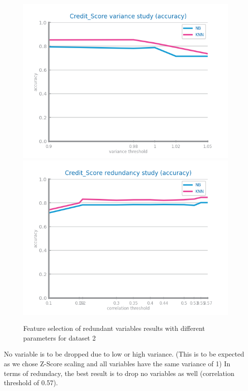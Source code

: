 \documentclass[10pt]{extarticle}
\begin{document}
\begin{figure}[H]
\centering\includegraphics[scale=0.60]{images/dataset2/data_preparation/Credit_Score_fs_low_var_accuracy_study_.png}
\includegraphics[scale=0.60]{images/dataset2/data_preparation/Credit_Score_fs_redundancy_accuracy_study.png}
\caption{Feature selection of redundant variables results with different parameters for dataset 2}
\end{figure}
No variable is to be dropped due to low or high variance. (This is to be expected as we chose Z-Score scaling and all
variables have the same variance of 1)
In terms of redundacy, the best result is to drop no variables as well (correlation threshold of 0.57).
\end{document}
